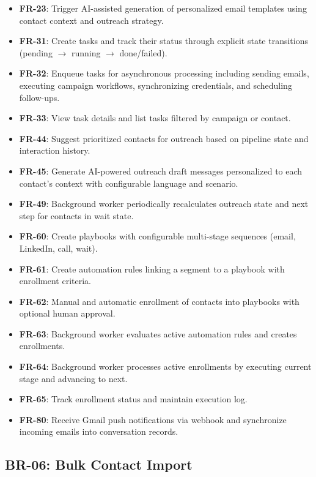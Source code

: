 \documentclass[a4paper]{article}
\begin{document}
\begin{itemize}
    \item \textbf{FR-23}: Trigger AI-assisted generation of
    personalized email templates using contact context and outreach
    strategy.
    \item \textbf{FR-31}: Create tasks and track their status
    through explicit state transitions (pending $\rightarrow$
    running $\rightarrow$ done/failed).
    \item \textbf{FR-32}: Enqueue tasks for asynchronous processing
    including sending emails, executing campaign workflows,
    synchronizing credentials, and scheduling follow-ups.
    \item \textbf{FR-33}: View task details and list tasks filtered
    by campaign or contact.
    \item \textbf{FR-44}: Suggest prioritized contacts for outreach
    based on pipeline state and interaction history.
    \item \textbf{FR-45}: Generate AI-powered outreach draft
    messages personalized to each contact's context with
    configurable language and scenario.
    \item \textbf{FR-49}: Background worker periodically
    recalculates outreach state and next step for contacts in wait
    state.
    \item \textbf{FR-60}: Create playbooks with configurable
    multi-stage sequences (email, LinkedIn, call, wait).
    \item \textbf{FR-61}: Create automation rules linking a segment
    to a playbook with enrollment criteria.
    \item \textbf{FR-62}: Manual and automatic enrollment of
    contacts into playbooks with optional human approval.
    \item \textbf{FR-63}: Background worker evaluates active
    automation rules and creates enrollments.
    \item \textbf{FR-64}: Background worker processes active
    enrollments by executing current stage and advancing to next.
    \item \textbf{FR-65}: Track enrollment status and maintain
    execution log.
    \item \textbf{FR-80}: Receive Gmail push notifications via
    webhook and synchronize incoming emails into conversation
    records.
\end{itemize}

\subsection{BR-06: Bulk Contact Import}
\end{document}
